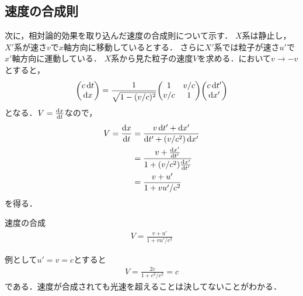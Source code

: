 \documentclass{report}
\begin{document}
  \subsection{速度の合成則}
    次に，相対論的効果を取り込んだ速度の合成則について示す．
    $X$系は静止し，$X'$系が速さ$v$で$x$軸方向に移動しているとする．
    さらに$X'$系では粒子が速さ$u'$で$x'$軸方向に運動している．
    $X$系から見た粒子の速度$V$を求める．において$v\to -v$とすると，
    \begin{align}
      \mqty(c\dd{t} \\ \dd{x})
      =
      \frac{1}{\sqrt{1 - (v/c)^2}}
      \mqty(
        1 & v/c\\
        v/c & 1
      )
      \mqty(c\dd{t'}\\ \dd{x'})
    \end{align}
    となる．$V=\dv{x}{t}$なので，
    \begin{align}
      V = \dv{x}{t} &= \frac{v \dd{t'} + \dd{x'}}{\dd{t'} + (v/c^2)\dd{x'}}\\
      &= \frac{v + \dv{x'}{t'}}{1 + (v/c^2)\dv{x'}{t'}}\\
      &= \frac{v + u'}{1 + vu' / c^2}
    \end{align}
    を得る．
    \begin{itembox}[l]{速度の合成}
      \begin{align}
        V = \frac{v + u'}{1 + vu'/ c^2}
      \end{align}
    \end{itembox}
    例として$u' = v = c$とすると
    \begin{align}
      V = \frac{2c}{1+c^2/c^2} = c
    \end{align}
    である．速度が合成されても光速を超えることは決してないことがわかる．
\end{document}
